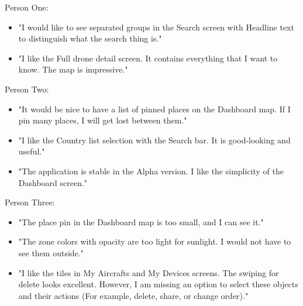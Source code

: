 Person One:
\begin{itemize}
    \item "I would like to see separated groups in the Search screen with Headline text to distinguish what the search thing is."
    \item "I like the Full drone detail screen.
    It contains everything that I want to know. The map is impressive."
\end{itemize}
Person Two:
\begin{itemize}
    \item "It would be nice to have a list of pinned places on the Dashboard map.
    If I pin many places, I will get lost between them."
    \item "I like the Country list selection with the Search bar.
    It is good-looking and useful."
    \item "The application is stable in the Alpha version.
    I like the simplicity of the Dashboard screen."
\end{itemize}
Person Three:
\begin{itemize}
    \item "The place pin in the Dashboard map is too small, and I can see it."
    \item "The zone colors with opacity are too light for sunlight.
    I would not have to see them outside."
    \item "I like the tiles in My Aircrafts and My Devices screens.
    The swiping for delete looks excellent.
    However, I am missing an option to select these objects and their actions (For example, delete, share, or change order)."
\end{itemize}


